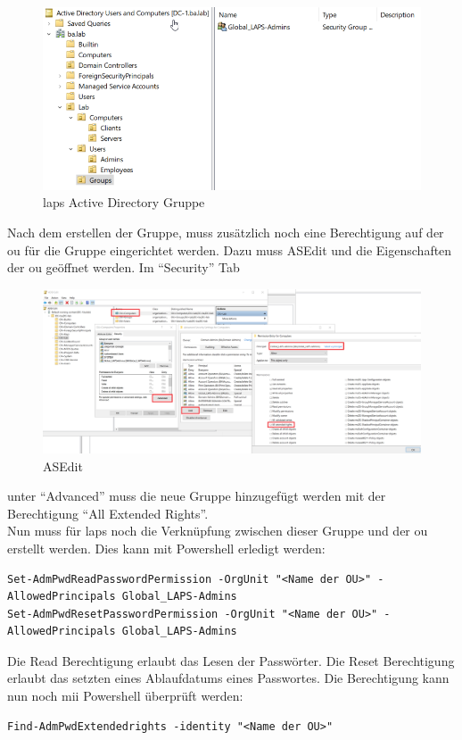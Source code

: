 \begin{figure}[H]
    \centering
    \includegraphics[width=\linewidth]{../img/LAPS/Laps-Admins.png}
    \caption{\acrshort{laps} Active Directory Gruppe}
\end{figure}

Nach dem erstellen der Gruppe, muss zusätzlich noch eine Berechtigung auf der \acrshort{ou} für die Gruppe eingerichtet werden.
Dazu muss ASEdit und die Eigenschaften der \acrshort{ou} geöffnet werden. Im ``Security'' Tab
\begin{figure}[H]
    \centering
    \includegraphics[width=0.7\linewidth]{../img/LAPS/ASEdit.png}
    \caption{ASEdit}
\end{figure}
unter ``Advanced'' muss die neue Gruppe hinzugefügt werden mit der Berechtigung ``All Extended Rights''.\\

Nun muss für \acrshort{laps} noch die Verknüpfung zwischen dieser Gruppe und der \acrshort{ou} erstellt werden.
Dies kann mit Powershell erledigt werden:
\begin{lstlisting}
Set-AdmPwdReadPasswordPermission -OrgUnit "<Name der OU>" -AllowedPrincipals Global_LAPS-Admins
Set-AdmPwdResetPasswordPermission -OrgUnit "<Name der OU>" -AllowedPrincipals Global_LAPS-Admins
\end{lstlisting}
Die Read Berechtigung erlaubt das Lesen der Passwörter.
Die Reset Berechtigung erlaubt das setzten eines Ablaufdatums eines Passwortes.
Die Berechtigung kann nun noch mii Powershell überprüft werden:
\begin{lstlisting}
Find-AdmPwdExtendedrights -identity "<Name der OU>"
\end{lstlisting}


